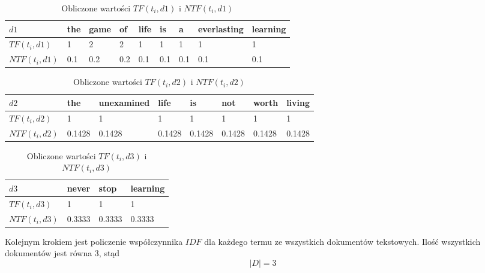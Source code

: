         
        \begin{table}[h!]
            \centering
            \caption{Obliczone wartości $TF(t_i, d1)$ i $NTF(t_i, d1)$}
            \label{tfd1}
            \begin{tabular}{|l|l|l|l|l|l|l|l|l|}
            \hline
            $d1$ & the & game & of & life & is & a & everlasting & learning \\ \hline
            $TF(t_i, d1)$        & 1   & 2    & 2  & 1    & 1  & 1 & 1           & 1        \\ \hline
            $NTF(t_i, d1)$ & 0.1 & 0.2 & 0.2 & 0.1 & 0.1 & 0.1 & 0.1 & 0.1 \\ \hline
            \end{tabular}
        \end{table}
        
        \begin{table}[h!]
            \centering
            \caption{Obliczone wartości $TF(t_i, d2)$ i $NTF(t_i, d2)$}
            \label{tfd2}
            \begin{tabular}{|l|l|l|l|l|l|l|l|}
            \hline
            $d2$            & the & unexamined & life & is & not & worth & living \\ \hline
            $TF(t_i, d2)$ & 1   & 1          & 1    & 1  & 1   & 1     & 1      \\ \hline
            $NTF(t_i, d2)$ & 0.1428 & 0.1428 & 0.1428 & 0.1428 & 0.1428 & 0.1428 & 0.1428 \\ \hline
            \end{tabular}
        \end{table}

        \begin{table}[h!]
            \centering
            \caption{Obliczone wartości $TF(t_i, d3)$ i $NTF(t_i, d3)$}
            \label{tfd3}
            \begin{tabular}{|l|l|l|l|}
            \hline
            $d3$            & never & stop & learning \\ \hline
            $TF(t_i, d3)$ & 1     & 1    & 1        \\ \hline
            $NTF(t_i, d3)$ & 0.3333 & 0.3333 & 0.3333  \\ \hline
            \end{tabular}
        \end{table}
        \newpage
        Kolejnym krokiem jest policzenie współczynnika $IDF$ dla każdego termu ze wszystkich dokumentów tekstowych. Ilość wszystkich dokumentów jest równa 3, stąd
        \begin{equation}
            |D| = 3
        \end{equation}
        
